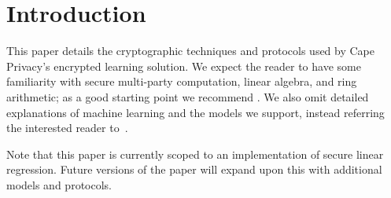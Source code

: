 
\section{Introduction}

This paper details the cryptographic techniques and protocols used by Cape Privacy's encrypted learning solution. We expect the reader to have some familiarity with secure multi-party computation, linear algebra, and ring arithmetic; as a good starting point we recommend \cite{evans2017pragmatic}. We also omit detailed explanations of machine learning and the models we support, instead referring the interested reader to~\cite{mml}.

Note that this paper is currently scoped to an implementation of secure linear regression. Future versions of the paper will expand upon this with additional models and protocols.


